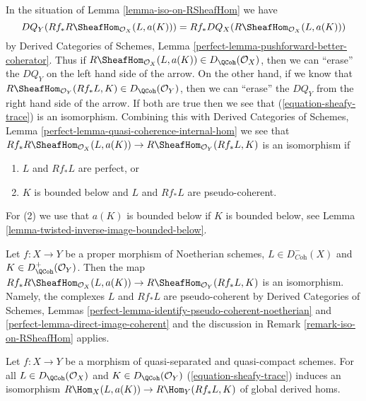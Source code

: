 \begin{remark}
\label{remark-iso-on-RSheafHom}
In the situation of Lemma \ref{lemma-iso-on-RSheafHom} we have
$$
DQ_Y(Rf_*R\SheafHom_{\mathcal{O}_X}(L, a(K))) =
Rf_* DQ_X(R\SheafHom_{\mathcal{O}_X}(L, a(K)))
$$
by Derived Categories of Schemes, Lemma
\ref{perfect-lemma-pushforward-better-coherator}.
Thus if $R\SheafHom_{\mathcal{O}_X}(L, a(K)) \in D_\QCoh(\mathcal{O}_X)$,
then we can ``erase'' the $DQ_Y$ on the left hand side of the arrow.
On the other hand, if we know that
$R\SheafHom_{\mathcal{O}_Y}(Rf_*L, K) \in D_\QCoh(\mathcal{O}_Y)$,
then we can ``erase'' the $DQ_Y$ from the right hand side of the arrow.
If both are true then we see that (\ref{equation-sheafy-trace})
is an isomorphism. Combining this with
Derived Categories of Schemes, Lemma
\ref{perfect-lemma-quasi-coherence-internal-hom}
we see that $Rf_*R\SheafHom_{\mathcal{O}_X}(L, a(K)) \to
R\SheafHom_{\mathcal{O}_Y}(Rf_*L, K)$ is an isomorphism if
\begin{enumerate}
\item $L$ and $Rf_*L$ are perfect, or
\item $K$ is bounded below and $L$ and $Rf_*L$ are pseudo-coherent.
\end{enumerate}
For (2) we use that $a(K)$ is bounded below if $K$
is bounded below, see Lemma \ref{lemma-twisted-inverse-image-bounded-below}.
\end{remark}

\begin{example}
\label{example-iso-on-RSheafHom-noetherian}
Let $f : X \to Y$ be a proper morphism of Noetherian schemes,
$L \in D^-_{\textit{Coh}}(X)$ and $K \in D^+_{\QCoh}(\mathcal{O}_Y)$.
Then the map $Rf_*R\SheafHom_{\mathcal{O}_X}(L, a(K)) \to
R\SheafHom_{\mathcal{O}_Y}(Rf_*L, K)$ is an isomorphism.
Namely, the complexes $L$ and $Rf_*L$ are pseudo-coherent by
Derived Categories of Schemes, Lemmas
\ref{perfect-lemma-identify-pseudo-coherent-noetherian} and
\ref{perfect-lemma-direct-image-coherent}
and the discussion in Remark \ref{remark-iso-on-RSheafHom} applies.
\end{example}

\begin{lemma}
\label{lemma-iso-global-hom}
Let $f : X \to Y$ be a morphism of quasi-separated and quasi-compact
schemes.
For all $L \in D_\QCoh(\mathcal{O}_X)$ and $K \in D_\QCoh(\mathcal{O}_Y)$
(\ref{equation-sheafy-trace}) induces an isomorphism
$R\Hom_X(L, a(K)) \to R\Hom_Y(Rf_*L, K)$ of global derived homs.
\end{lemma}

